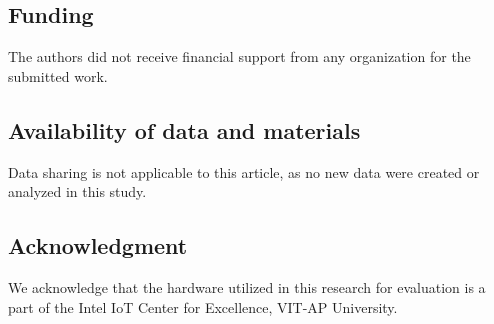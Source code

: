 \documentclass[a4paper,fleqn]{cas-dc}
\numberwithin{equation}{section}
\begin{document}
\subsection*{Funding}
The authors did not receive financial support from any organization for the submitted work.

\subsection*{Availability of data and materials}
Data sharing is not applicable to this article, as no new data were created or analyzed in this study.

\subsection*{Acknowledgment}
We acknowledge that the hardware utilized in this research for evaluation is a part of the Intel IoT Center for Excellence, VIT-AP University. 



\end{document}
